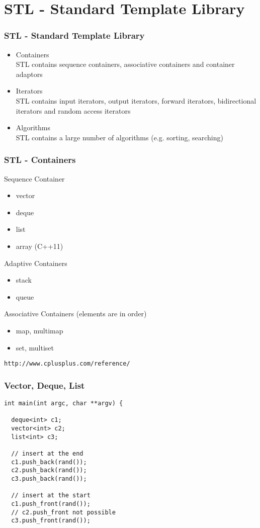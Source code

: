 \section{STL - Standard Template Library}

\begin{frame}[fragile] 
  \frametitle{STL - Standard Template Library}
  \begin{itemize}
  \item Containers\\
  {\small STL contains sequence containers, associative containers and container adaptors}
  \item Iterators\\
  {\small STL contains input iterators, output iterators, forward iterators, bidirectional iterators and random access iterators}
  \item Algorithms\\
  {\small STL contains a large number of algorithms (e.g. sorting, searching)}
  \end{itemize}
\end{frame}

\begin{frame}[fragile] 
  \frametitle{STL - Containers}
  Sequence Container
  {\small
  \begin{itemize}
  \item vector
  \item deque
  \item list
  \item array (C++11)
  \end{itemize}
  Adaptive Containers
  \begin{itemize}
  \item stack
  \item queue
  \end{itemize}
  Associative Containers (elements are in order)
  \begin{itemize}
  \item map, multimap
  \item set, multiset
  \end{itemize}
  \verb|http://www.cplusplus.com/reference/|
  }
\end{frame}

\begin{frame}[fragile] 
\frametitle{Vector, Deque, List}
{\tiny
\begin{lstlisting}
int main(int argc, char **argv) {

  deque<int> c1;
  vector<int> c2;
  list<int> c3;
  
  // insert at the end
  c1.push_back(rand());
  c2.push_back(rand());
  c3.push_back(rand());
  
  // insert at the start
  c1.push_front(rand());
  // c2.push_front not possible
  c3.push_front(rand());
\end{lstlisting}
}
\end{frame}

